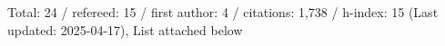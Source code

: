 Total: 24 / refereed: 15 / first author: 4 / citations: 1,738 / h-index: 15 (Last updated: 2025-04-17), List attached below